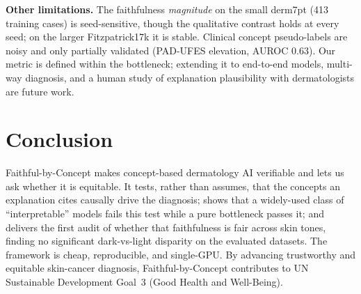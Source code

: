 \documentclass{svproc}
\begin{document}
\noindent\textbf{Other limitations.} The faithfulness \emph{magnitude} on the small
derm7pt (413 training cases) is seed-sensitive, though the qualitative contrast holds at
every seed; on the larger Fitzpatrick17k it is stable. Clinical concept pseudo-labels
are noisy and only partially validated (PAD-UFES elevation, AUROC $0.63$). Our metric is
defined within the bottleneck; extending it to end-to-end models, multi-way diagnosis,
and a human study of explanation plausibility with dermatologists are future work.

\section{Conclusion}
Faithful-by-Concept makes concept-based dermatology AI verifiable and lets us ask
whether it is equitable. It tests, rather than assumes, that the concepts an
explanation cites causally drive the diagnosis; shows that a widely-used class of
``interpretable'' models fails this test while a pure bottleneck passes it; and
delivers the first audit of whether that faithfulness is fair across skin tones,
finding no significant dark-vs-light disparity on the evaluated datasets. The framework
is cheap, reproducible, and single-GPU. By advancing trustworthy and equitable
skin-cancer diagnosis, Faithful-by-Concept contributes to UN Sustainable Development
Goal~3 (Good Health and Well-Being).
\end{document}

